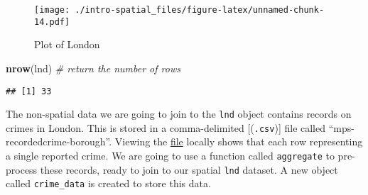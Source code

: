 \documentclass[]{article}
\newenvironment{Shaded}{}{}
\newcommand{\KeywordTok}[1]{\textcolor[rgb]{0.00,0.44,0.13}{\textbf{{#1}}}}
\newcommand{\DataTypeTok}[1]{\textcolor[rgb]{0.56,0.13,0.00}{{#1}}}
\newcommand{\DecValTok}[1]{\textcolor[rgb]{0.25,0.63,0.44}{{#1}}}
\newcommand{\StringTok}[1]{\textcolor[rgb]{0.25,0.44,0.63}{{#1}}}
\newcommand{\CommentTok}[1]{\textcolor[rgb]{0.38,0.63,0.69}{\textit{{#1}}}}
\newcommand{\NormalTok}[1]{{#1}}
\begin{document}
\begin{figure}[htbp]
\centering
\texttt{[image: ./intro-spatial\_files/figure-latex/unnamed-chunk-14.pdf]}
\caption{Plot of London}
\end{figure}

\begin{Shaded}
\begin{Highlighting}[]
\KeywordTok{nrow}\NormalTok{(lnd) }\CommentTok{# return the number of rows}
\end{Highlighting}
\end{Shaded}

\begin{verbatim}
## [1] 33
\end{verbatim}

The non-spatial data we are going to join to the \texttt{lnd} object
contains records on crimes in London. This is stored in a
comma-delimited {[}(\texttt{.csv}){]} file called
``mps-recordedcrime-borough''. Viewing the
\href{https://raw.githubusercontent.com/Robinlovelace/Creating-maps-in-R/master/data/mps-recordedcrime-borough.csv}{file}
locally shows that each row representing a single reported crime. We are
going to use a function called \texttt{aggregate} to pre-process these
records, ready to join to our spatial \texttt{lnd} dataset. A new object
called \texttt{crime\_data} is created to store this data.

\begin{Shaded}
\end{Shaded}
\end{document}
